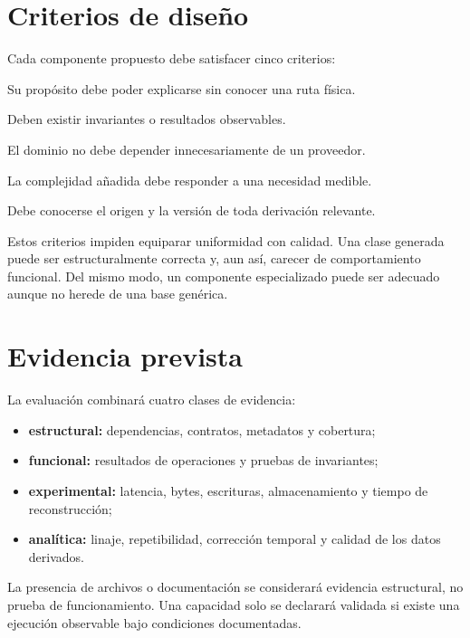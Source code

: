 \section{Criterios de diseño}

Cada componente propuesto debe satisfacer cinco criterios:

\begin{description}[leftmargin=3.4cm,style=nextline]
  \item[Comprensibilidad] Su propósito debe poder explicarse sin conocer una ruta física.
  \item[Verificabilidad] Deben existir invariantes o resultados observables.
  \item[Reemplazabilidad] El dominio no debe depender innecesariamente de un proveedor.
  \item[Proporcionalidad] La complejidad añadida debe responder a una necesidad medible.
  \item[Trazabilidad] Debe conocerse el origen y la versión de toda derivación relevante.
\end{description}

Estos criterios impiden equiparar uniformidad con calidad. Una clase generada puede ser
estructuralmente correcta y, aun así, carecer de comportamiento funcional. Del mismo
modo, un componente especializado puede ser adecuado aunque no herede de una base
genérica.

\section{Evidencia prevista}

La evaluación combinará cuatro clases de evidencia:

\begin{itemize}[leftmargin=*]
  \item \textbf{estructural:} dependencias, contratos, metadatos y cobertura;
  \item \textbf{funcional:} resultados de operaciones y pruebas de invariantes;
  \item \textbf{experimental:} latencia, bytes, escrituras, almacenamiento y tiempo de
  reconstrucción;
  \item \textbf{analítica:} linaje, repetibilidad, corrección temporal y calidad de los
  datos derivados.
\end{itemize}

La presencia de archivos o documentación se considerará evidencia estructural, no prueba
de funcionamiento. Una capacidad solo se declarará validada si existe una ejecución
observable bajo condiciones documentadas.

